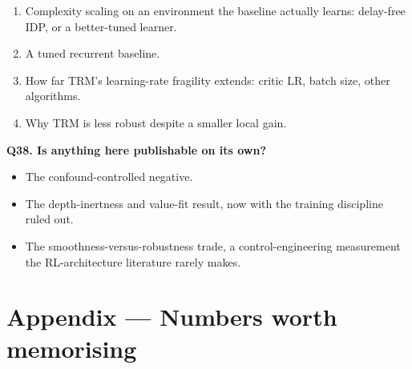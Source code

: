 \documentclass[11pt]{article}
\begin{document}
\begin{enumerate}
\item Complexity scaling on an environment the baseline actually learns: delay-free IDP, or a better-tuned learner.
\item A tuned recurrent baseline.
\item How far TRM's learning-rate fragility extends: critic LR, batch size, other algorithms.
\item Why TRM is less robust despite a smaller local gain.
\end{enumerate}



\textbf{Q38. Is anything here publishable on its own?}

\begin{itemize}
\item The confound-controlled negative.
\item The depth-inertness and value-fit result, now with the training discipline ruled out.
\item The smoothness-versus-robustness trade, a control-engineering measurement the RL-architecture literature rarely makes.
\end{itemize}



\medskip



\section*{Appendix --- Numbers worth memorising}
\end{document}
